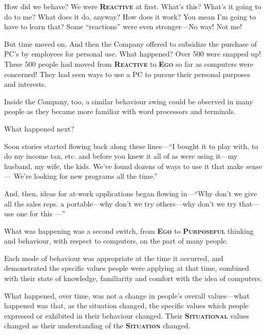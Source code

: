 \documentclass[a5paper]{article}
\begin{document}
How did we behave?
We were \textbf{\scshape Reactive} at first.
What's this?
What's it going to do to me?
What does it do, anyway?
How does it work?
You mean I'm going to have to learn that?
Some ``reactions'' were even stronger---No way!
Not me!

But time moved on.
And then the Company offered to subsidize the purchase of PC's by employees for personal use.
What happened?
Over 500 were snapped up!
These 500 people had moved from \textbf{\scshape Reactive} to \textbf{\scshape Ego} so far as computers were concerned!
They had seen ways to use a PC to pursue their personal purposes and interests.

Inside the Company, too, a similar behaviour swing could be observed in many people as they became more familiar with word processors and terminals.

What happened next?

Soon stories started flowing back along these lines---``I bought it to play with, to do my income tax, etc. and before you knew it all of as were using it---my husband, my wife, the kids.
We've found dozens of ways to use it that make sense ---
We're looking for new programs all the time.''

And, then, ideas for at-work applications began flowing in---``Why don't we give all the sales reps. a portable---why don't we try others---why don't we try that---use one for this ---''

What was happening was a second switch, from \textbf{\scshape Ego} to \textbf{\scshape Purposeful} thinking and behaviour, with respect to computers, on the part of many people.

\begin{figure}[h]
\centering
{}
\end{figure}

Each mode of behaviour was appropriate at the time it occurred, and demonstrated the specific values people were applying at that time, combined with their state of knowledge, familiarity and comfort with the idea of computers.

What happened, over time, was not a change in people's overall values---what happened was that, as the situation changed, the specific values which people expressed or exhibited in their behaviour changed.
Their \textbf{\scshape Situational} values changed as their understanding of the \textbf{\scshape Situation} changed.
\end{document}
